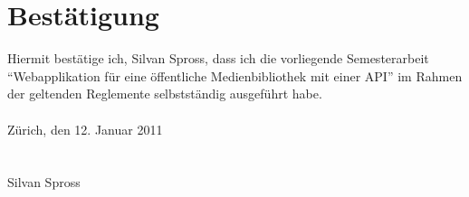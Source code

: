 \documentclass[abstracton,liststotoc,bibtotoc]{scrreprt}
\begin{document}
    \chapter{Bestätigung}
    Hiermit bestätige ich, Silvan Spross, dass ich die vorliegende Semesterarbeit
    "`Webapplikation für eine öffentliche Medienbibliothek mit einer API"' im
    Rahmen der geltenden Reglemente selbstständig ausgeführt habe.\\
    \\
    Zürich, den 12. Januar 2011\\
    \\\\
    Silvan Spross
    
    \listoffigures

    \listoftables
    
    
    
    
\end{document}
